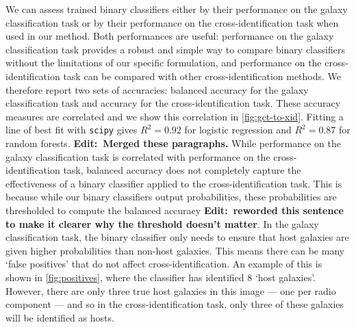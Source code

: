 \documentclass[fleqn,usenatbib,usedcolumn]{mnras}
\newcommand{\edit}[1]{{\bf Edit:~{#1}}}
\begin{document}
    We can assess trained binary classifiers either by their performance on the galaxy classification task or by their performance on the cross-identification task when used in our method. Both performances are useful: performance on the galaxy classification task provides a robust and simple way to compare binary classifiers without the limitations of our specific formulation, and performance on the cross-identification task can be compared with other cross-identification methods. We therefore report two sets of accuracies: balanced accuracy for the galaxy classification task and accuracy for the cross-identification task. These accuracy measures are correlated and we show this correlation in \autoref{fig:gct-to-xid}. Fitting a line of best fit with \texttt{scipy} gives $R^2 = 0.92$ for logistic regression and $R^2 = 0.87$ for random forests. \edit{Merged these paragraphs.} While performance on the galaxy classification task is correlated with performance on the cross-identification task, balanced accuracy does not completely capture the effectiveness of a binary classifier applied to the cross-identification task. This is because while our binary classifiers output probabilities, these probabilities are thresholded to compute the balanced accuracy \edit{reworded this sentence to make it clearer why the threshold doesn't matter}. In the galaxy classification task, the binary classifier only needs to ensure that host galaxies are given higher probabilities than non-host galaxies. This means there can be many `false positives' that do not affect cross-identification. An example of this is shown in \autoref{fig:positives}, where the classifier has identified 8 `host galaxies'. However, there are only three true host galaxies in this image --- one per radio component --- and so in the cross-identification task, only three of these galaxies will be identified as hosts.
\end{document}
